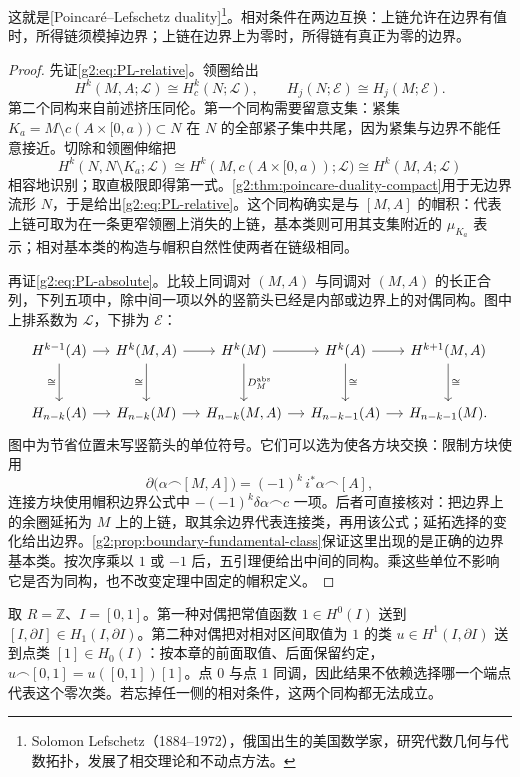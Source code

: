 这就是[Poincaré--Lefschetz duality]\footnote{Solomon Lefschetz（1884--1972），俄国出生的美国数学家，研究代数几何与代数拓扑，发展了相交理论和不动点方法。}。相对条件在两边互换：上链允许在边界有值时，所得链须模掉边界；上链在边界上为零时，所得链有真正为零的边界。

\begin{proof}
	先证\eqref{g2:eq:PL-relative}。领圈给出
	\[
		H^k(M,A;\mathcal L)\cong H_c^k(N;\mathcal L),
		\qquad H_j(N;\mathcal E)\cong H_j(M;\mathcal E).
	\]
	第二个同构来自前述挤压同伦。第一个同构需要留意支集：紧集 \(K_a=M\setminus c(A\times[0,a))\subset N\) 在 \(N\) 的全部紧子集中共尾，因为紧集与边界不能任意接近。切除和领圈伸缩把
	\[
		H^k(N,N\setminus K_a;\mathcal L)
		\cong H^k(M,c(A\times[0,a));\mathcal L)
		\cong H^k(M,A;\mathcal L)
	\]
	相容地识别；取直极限即得第一式。\cref{g2:thm:poincare-duality-compact}用于无边界流形 \(N\)，于是给出\eqref{g2:eq:PL-relative}。这个同构确实是与 \([M,A]\) 的帽积：代表上链可取为在一条更窄领圈上消失的上链，基本类则可用其支集附近的 \(\mu_{K_a}\) 表示；相对基本类的构造与帽积自然性使两者在链级相同。

	再证\eqref{g2:eq:PL-absolute}。比较上同调对 \((M,A)\) 与同调对 \((M,A)\) 的长正合列，下列五项中，除中间一项以外的竖箭头已经是内部或边界上的对偶同构。图中上排系数为 \(\mathcal L\)，下排为 \(\mathcal E\)：
	\[
		\begin{tikzcd}[column sep=small,row sep=large]
			H^{k-1}(A) \arrow[r] \arrow[d,"\cong"'] & H^k(M,A) \arrow[r] \arrow[d,"\cong"'] & H^k(M) \arrow[r] \arrow[d,"D_M^{\mathrm{abs}}"] & H^k(A) \arrow[r] \arrow[d,"\cong"] & H^{k+1}(M,A) \arrow[d,"\cong"] \\
			H_{n-k}(A) \arrow[r] & H_{n-k}(M) \arrow[r] & H_{n-k}(M,A) \arrow[r] & H_{n-k-1}(A) \arrow[r] & H_{n-k-1}(M).
		\end{tikzcd}
	\]
	图中为节省位置未写竖箭头的单位符号。它们可以选为使各方块交换：限制方块使用
	\[
		\partial\bigl(\alpha\frown[M,A]\bigr)
		=(-1)^k\,i^*\alpha\frown[A],
	\]
	连接方块使用帽积边界公式中 \(-(-1)^k\delta\alpha\frown c\) 一项。后者可直接核对：把边界上的余圈延拓为 \(M\) 上的上链，取其余边界代表连接类，再用该公式；延拓选择的变化给出边界。\cref{g2:prop:boundary-fundamental-class}保证这里出现的是正确的边界基本类。按次序乘以 \(1\) 或 \(-1\) 后，五引理便给出中间的同构。乘这些单位不影响它是否为同构，也不改变定理中固定的帽积定义。
\end{proof}

\begin{example}\label{g2:exm:interval-duality}
	取 \(R=\mathbb Z\)、\(I=[0,1]\)。第一种对偶把常值函数 \(1\in H^0(I)\) 送到 \([I,\partial I]\in H_1(I,\partial I)\)。第二种对偶把对相对区间取值为 \(1\) 的类 \(u\in H^1(I,\partial I)\) 送到点类 \([1]\in H_0(I)\)：按本章的前面取值、后面保留约定，\(u\frown[0,1]=u([0,1])[1]\)。点 \(0\) 与点 \(1\) 同调，因此结果不依赖选择哪一个端点代表这个零次类。若忘掉任一侧的相对条件，这两个同构都无法成立。
\end{example}

